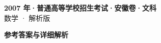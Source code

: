 \documentclass[zihao=-4, a4paper]{ctexart}
\begin{document}
\begin{center}
  {\Large\bfseries 2007 年·普通高等学校招生考试·安徽卷·文科}\\[4pt]
  {\large 数学 · 解析版}
\end{center}
\medskip
{}

\clearpage
{}
\begin{center}{\Large\bfseries 参考答案与详细解析}\end{center}
\medskip

\end{document}
